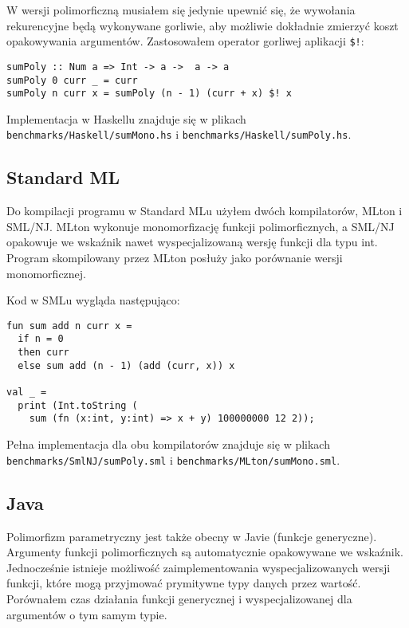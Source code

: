 \documentclass[declaration,shortabstract]{iithesis}
\begin{document}
W wersji polimorficzną musiałem się jedynie upewnić się, że wywołania rekurencyjne 
będą wykonywane gorliwie, aby możliwie dokładnie zmierzyć koszt opakowywania 
argumentów. Zastosowałem operator gorliwej aplikacji \texttt{\$!}:

\begin{lstlisting}[frame=lines]
sumPoly :: Num a => Int -> a ->  a -> a
sumPoly 0 curr _ = curr 
sumPoly n curr x = sumPoly (n - 1) (curr + x) $! x
\end{lstlisting}

Implementacja w Haskellu znajduje się w plikach \newline
\texttt{benchmarks/Haskell/sumMono.hs} i \texttt{benchmarks/Haskell/sumPoly.hs}.

\subsection{Standard ML}

Do kompilacji programu w Standard MLu użyłem dwóch kompilatorów, MLton i SML/NJ.
MLton wykonuje monomorfizację funkcji polimorficznych, a SML/NJ opakowuje we 
wskaźnik nawet wyspecjalizowaną wersję funkcji dla typu int. Program skompilowany 
przez MLton posłuży jako porównanie wersji monomorficznej.

Kod w SMLu wygląda następująco:
\begin{lstlisting}[frame=lines]
fun sum add n curr x =
  if n = 0 
  then curr 
  else sum add (n - 1) (add (curr, x)) x

val _ = 
  print (Int.toString (
    sum (fn (x:int, y:int) => x + y) 100000000 12 2));
\end{lstlisting}
Pełna implementacja dla obu kompilatorów znajduje się w plikach \newline
\texttt{benchmarks/SmlNJ/sumPoly.sml} i \texttt{benchmarks/MLton/sumMono.sml}.

\subsection{Java}

Polimorfizm parametryczny jest także obecny w Javie (funkcje generyczne). 
Argumenty funkcji polimorficznych są automatycznie opakowywane we wskaźnik. 
Jednocześnie istnieje możliwość zaimplementowania wyspecjalizowanych wersji 
funkcji, które mogą przyjmować prymitywne typy danych przez wartość. Porównałem
czas działania funkcji generycznej i wyspecjalizowanej dla argumentów o tym samym 
typie. 
\end{document}
